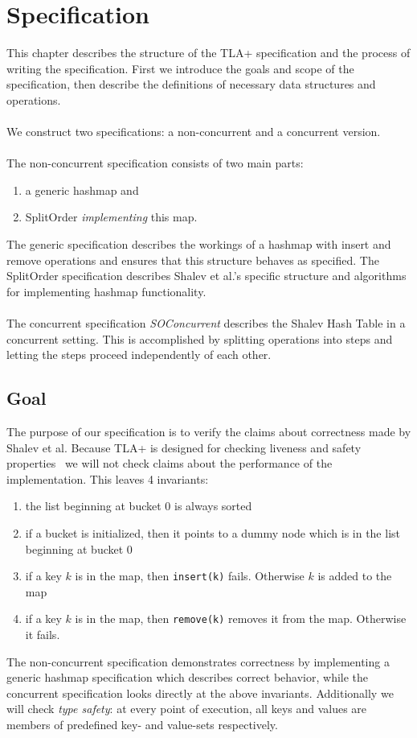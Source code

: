 \documentclass{uit-thesis}
\begin{document}
\chapter{Specification}\label{ch:specification}
This chapter describes the structure of the TLA+ specification and the process of writing the specification. First we introduce the goals and scope of the specification, then describe the definitions of necessary data structures and operations.
\\\\
We construct two specifications: a non-concurrent and a concurrent version.
\\\\
The non-concurrent specification consists of two main parts:
\begin{enumerate}
    \item a generic hashmap and
    \item SplitOrder \emph{implementing} this map.
\end{enumerate}
The generic specification describes the workings of a hashmap with insert and remove operations and ensures that this structure behaves as specified. The SplitOrder specification describes Shalev et al.'s specific structure and algorithms for implementing hashmap functionality.
\\\\
The concurrent specification \textit{SOConcurrent} describes the Shalev Hash Table in a concurrent setting. This is accomplished by splitting operations into steps and letting the steps proceed independently of each other.

\section{Goal}\label{sec:spec-goals}
The purpose of our specification is to verify the claims about correctness made by Shalev et al. Because TLA+ is designed for checking liveness and safety properties~\cite{Lund2019} we will not check claims about the performance of the implementation. This leaves 4 invariants:
\begin{enumerate}
    \item the list beginning at bucket 0 is always sorted
    \item if a bucket is initialized, then it points to a dummy node which is in the list beginning at bucket 0
    \item if a key $k$ is in the map, then \texttt{insert(k)} fails. Otherwise $k$ is added to the map
    \item if a key $k$ is in the map, then \texttt{remove(k)} removes it from the map. Otherwise it fails.
\end{enumerate}
The non-concurrent specification demonstrates correctness by implementing a generic hashmap specification which describes correct behavior, while the concurrent specification looks directly at the above invariants.
Additionally we will check \textit{type safety}: at every point of execution, all keys and values are members of predefined key- and value-sets respectively.
\end{document}
